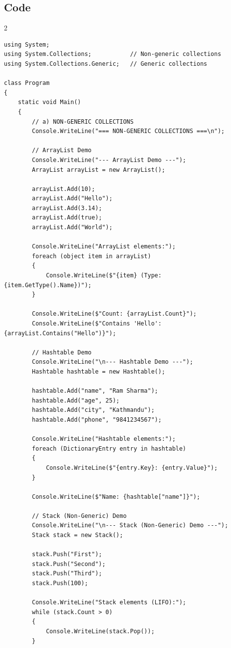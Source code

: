 \documentclass[10pt,a4paper]{article}
\begin{document}
\subsection*{Code}
\begin{multicols}{2}
\begin{lstlisting}
using System;
using System.Collections;           // Non-generic collections
using System.Collections.Generic;   // Generic collections

class Program
{
    static void Main()
    {
        // a) NON-GENERIC COLLECTIONS
        Console.WriteLine("=== NON-GENERIC COLLECTIONS ===\n");
        
        // ArrayList Demo
        Console.WriteLine("--- ArrayList Demo ---");
        ArrayList arrayList = new ArrayList();
        
        arrayList.Add(10);
        arrayList.Add("Hello");
        arrayList.Add(3.14);
        arrayList.Add(true);
        arrayList.Add("World");
        
        Console.WriteLine("ArrayList elements:");
        foreach (object item in arrayList)
        {
            Console.WriteLine($"{item} (Type: {item.GetType().Name})");
        }
        
        Console.WriteLine($"Count: {arrayList.Count}");
        Console.WriteLine($"Contains 'Hello': {arrayList.Contains("Hello")}");
        
        // Hashtable Demo
        Console.WriteLine("\n--- Hashtable Demo ---");
        Hashtable hashtable = new Hashtable();
        
        hashtable.Add("name", "Ram Sharma");
        hashtable.Add("age", 25);
        hashtable.Add("city", "Kathmandu");
        hashtable.Add("phone", "9841234567");
        
        Console.WriteLine("Hashtable elements:");
        foreach (DictionaryEntry entry in hashtable)
        {
            Console.WriteLine($"{entry.Key}: {entry.Value}");
        }
        
        Console.WriteLine($"Name: {hashtable["name"]}");
        
        // Stack (Non-Generic) Demo
        Console.WriteLine("\n--- Stack (Non-Generic) Demo ---");
        Stack stack = new Stack();
        
        stack.Push("First");
        stack.Push("Second");
        stack.Push("Third");
        stack.Push(100);
        
        Console.WriteLine("Stack elements (LIFO):");
        while (stack.Count > 0)
        {
            Console.WriteLine(stack.Pop());
        }
        

\end{lstlisting}
\end{multicols}
\end{document}
